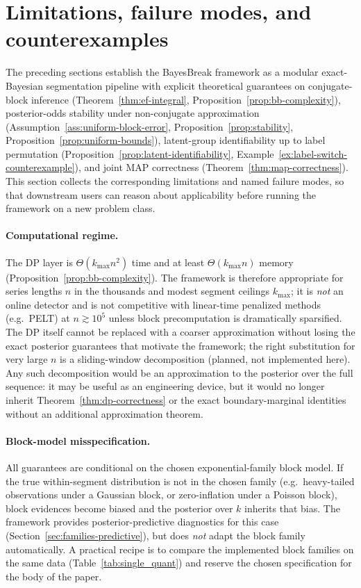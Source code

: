 \section{Limitations, failure modes, and counterexamples}
\label{sec:limitations}

The preceding sections establish the BayesBreak framework as a modular exact-Bayesian
segmentation pipeline with explicit theoretical guarantees on conjugate-block inference
(Theorem~\ref{thm:ef-integral}, Proposition~\ref{prop:bb-complexity}), posterior-odds
stability under non-conjugate approximation (Assumption~\ref{ass:uniform-block-error},
Proposition~\ref{prop:stability}, Proposition~\ref{prop:uniform-bounds}), latent-group
identifiability up to label permutation (Proposition~\ref{prop:latent-identifiability},
Example~\ref{ex:label-switch-counterexample}), and joint MAP correctness
(Theorem~\ref{thm:map-correctness}). This section collects the corresponding limitations
and named failure modes, so that downstream users can reason about applicability
before running the framework on a new problem class.

\paragraph{Computational regime.}
The DP layer is $\Theta(k_{\max} n^2)$ time and at least $\Theta(k_{\max} n)$ memory
(Proposition~\ref{prop:bb-complexity}). The framework is therefore appropriate for series
lengths $n$ in the thousands and modest segment ceilings $k_{\max}$; it is \emph{not} an
online detector and is not competitive with linear-time penalized methods (e.g.\ PELT) at
$n\gtrsim 10^5$ unless block precomputation is dramatically sparsified. The DP itself
cannot be replaced with a coarser approximation without losing the exact posterior
guarantees that motivate the framework; the right substitution for very large $n$ is a
sliding-window decomposition (planned, not implemented here). Any such decomposition would be an approximation to the posterior over the full sequence: it may be useful as an engineering device, but it would no longer inherit Theorem~\ref{thm:dp-correctness} or the exact boundary-marginal identities without an additional approximation theorem.

\paragraph{Block-model misspecification.}
All guarantees are conditional on the chosen exponential-family block model. If the true
within-segment distribution is not in the chosen family (e.g.\ heavy-tailed observations
under a Gaussian block, or zero-inflation under a Poisson block), block evidences become
biased and the posterior over $k$ inherits that bias. The framework provides
posterior-predictive diagnostics for this case (Section~\ref{sec:families-predictive}),
but does \emph{not} adapt the block family automatically. A practical recipe is to
compare the implemented block families on the same data (Table~\ref{tab:single_quant})
and reserve the chosen specification for the body of the paper.

